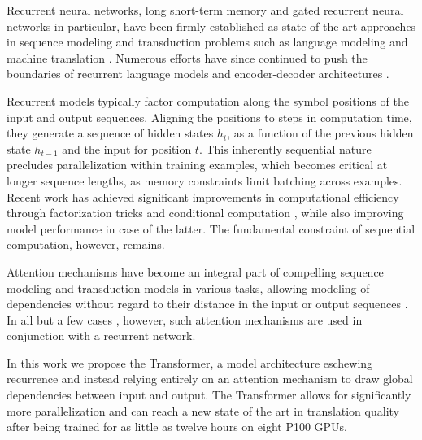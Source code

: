 Recurrent neural networks, long short-term memory \citep{hochreiter1997} and
gated recurrent \citep{gruEval14} neural networks in particular, have been
firmly established as state of the art approaches in sequence modeling and
transduction problems such as language modeling and machine translation
\citep{sutskever14, bahdanau2014neural, cho2014learning}. Numerous efforts have
since continued to push the boundaries of recurrent language models and
encoder-decoder architectures
\citep{wu2016google,luong2015effective,jozefowicz2016exploring}.

Recurrent models typically factor computation along the symbol positions of the
input and output sequences. Aligning the positions to steps in computation
time, they generate a sequence of hidden states $h_t$, as a function of the
previous hidden state $h_{t-1}$ and the input for position $t$. This inherently
sequential nature precludes parallelization within training examples, which
becomes critical at longer sequence lengths, as memory constraints limit
batching across examples.
Recent work has achieved significant improvements in computational efficiency
through factorization tricks \citep{Kuchaiev2017Factorization} and conditional
computation \citep{shazeer2017outrageously}, while also improving model
performance in case of the latter. The fundamental constraint of sequential
computation, however, remains.


Attention mechanisms have become an integral part of compelling sequence
modeling and transduction models in various tasks, allowing modeling of
dependencies without regard to their distance in the input or output sequences
\citep{bahdanau2014neural, structuredAttentionNetworks}. In all but a few cases
\citep{decomposableAttnModel}, however, such attention mechanisms are used in
conjunction with a recurrent network.


In this work we propose the Transformer, a model architecture eschewing
recurrence and instead relying entirely on an attention mechanism to draw
global dependencies between input and output. The Transformer allows for
significantly more parallelization and can reach a new state of the art in
translation quality after being trained for as little as twelve hours on eight
P100 GPUs.

